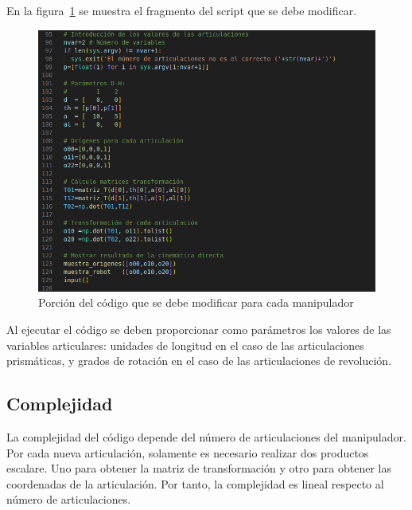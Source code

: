 En la figura~\ref{chapter:intro2} se muestra el fragmento del script que se debe modificar.
\begin{figure}[htb]
   \centering
   \includegraphics[width=1\linewidth]{images/cin_dir_1.png}
   \caption{Porción del código que se debe modificar para cada manipulador}
   \label{chapter:intro2}
\end{figure}

\bigskip Al ejecutar el código se deben proporcionar como parámetros los valores de las variables articulares: unidades de longitud en el caso de las articulaciones prismáticas, y grados de rotación en el caso de las articulaciones de revolución. 

\subsection{Complejidad}
La complejidad del código depende del número de articulaciones del manipulador. Por cada nueva articulación, solamente es necesario realizar dos productos escalare. Uno para obtener la matriz de transformación y otro para obtener las coordenadas de la articulación. Por tanto, la complejidad es lineal respecto al número de articulaciones.
